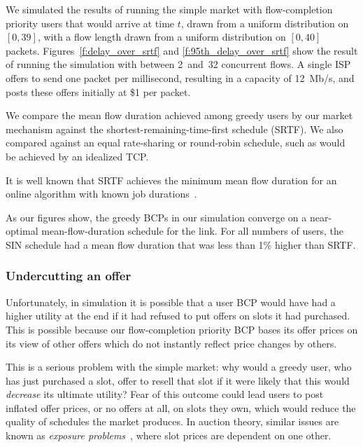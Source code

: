 We simulated the results of running the simple market with
flow-completion priority users that would arrive at time $t$, drawn
from a uniform distribution on $[0, 39]$, with a flow length drawn
from a uniform distribution on $[0, 40]$ packets.
Figures~\ref{f:delay_over_srtf} and \ref{f:95th_delay_over_srtf} show
the result of running the simulation with between 2~and~32 concurrent
flows. A single ISP offers to send one packet per millisecond,
resulting in a capacity of 12~Mb/s, and posts these offers initially at \$1 per
packet.

We compare the mean flow duration achieved among greedy users by our
market mechanism against the shortest-remaining-time-first schedule
(SRTF). We also compared against an equal rate-sharing or round-robin
schedule, such as would be achieved by an idealized TCP.

It is well known that SRTF achieves
the minimum mean flow duration for an online algorithm with
known job durations~\cite{karger10,bansal01}.

As our figures show, the greedy BCPs in our simulation converge on a
near-optimal mean-flow-duration schedule for the link. For all numbers
of users, the SIN schedule had a mean flow duration that was less
than 1\% higher than SRTF.

\subsubsection{Undercutting an offer}

Unfortunately, in simulation it is possible that a user BCP would have
had a higher utility at the end if it had refused to put offers on slots it had purchased.
This is possible because our flow-completion priority BCP bases its
offer prices on its view of other offers which do not instantly reflect price changes by others.

This is a serious problem with the simple market: why would a greedy
user, who has just purchased a slot, offer to resell that slot if it
were likely that this would \emph{decrease} its ultimate utility?
Fear of this outcome could lead users to post inflated offer prices, or no offers at all, on
slots they own, which would reduce the quality of schedules the market
produces. In auction theory, similar issues are known as 
\emph{exposure problems}~\cite{milgrom00,
englmaier06}, where slot prices are dependent on one other.

